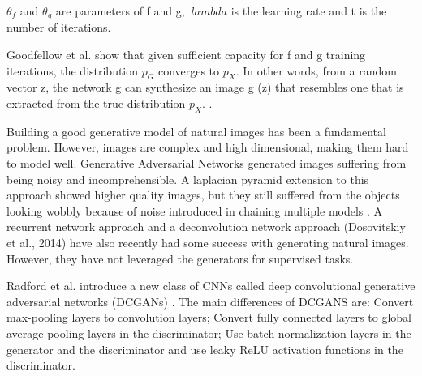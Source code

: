 $ \theta_f $ and $ \theta_g $ are parameters of f and g, $ \ lambda $ is the learning rate and t is the number of iterations.

Goodfellow et al. show that given sufficient capacity for f and g training iterations, the distribution $ p_G $ converges to $ p_X $. In other words, from a random vector z, the network g can synthesize an image g (z) that resembles one that is extracted from the true distribution $ p_X $. \cite{Goodfellow2014}.

Building a good generative model of natural images has been a fundamental problem. However, images are complex and high dimensional, making them hard to model well. Generative Adversarial Networks \cite{Goodfellow2014} generated images suffering from being noisy and incomprehensible. A laplacian pyramid extension to this approach showed higher quality images, but they still suffered from the objects looking wobbly because of noise introduced in chaining multiple models \cite{Denton2015}. A recurrent network approach \cite{gregor2015draw} and a deconvolution network approach (Dosovitskiy et al., 2014) have also recently had some success with generating natural images. However, they have not leveraged the generators for supervised tasks.

Radford et al.  introduce a new class of CNNs called deep convolutional generative adversarial networks (DCGANs) \cite{Radford2015UnsupervisedNetworks}. The main differences of DCGANS are: Convert max-pooling layers to convolution layers; Convert fully connected layers to global average pooling layers in the discriminator; Use batch normalization layers in the generator and the discriminator and use leaky ReLU activation functions in the discriminator.